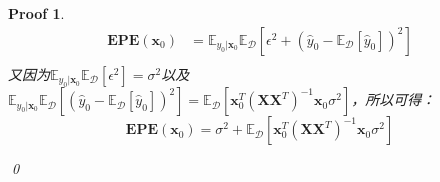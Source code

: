 \documentclass[a4paper,UTF8]{article}
\numberwithin{equation}{section}
\newtheorem*{myProof}{Proof}
\begin{document}
\begin{myProof}
\begin{equation}
\begin{aligned}
\mathbf{EPE}(\textbf{x}_0) &=\mathbb{E}_{y_0|\textbf{x}_0}\mathbb{E}_{\mathcal{D}}[\epsilon^2+(\hat{y}_0 - \mathbb{E}_{\mathcal{D}}[\hat{y}_0])^2]\\
\end{aligned}
\end{equation}
又因为$\mathbb{E}_{y_0|\textbf{x}_0}\mathbb{E}_{\mathcal{D}}[\epsilon^2] = \sigma^2$以及$ \mathbb{E}_{y_0|\textbf{x}_0}\mathbb{E}_{\mathcal{D}}[(\hat{y}_0 - \mathbb{E}_{\mathcal{D}}[\hat{y}_0])^2] = \mathbb{E}_{\mathcal{D}}[\textbf{x}_0^T(\textbf{X}\textbf{X}^T)^{-1}\textbf{x}_0\sigma^2] $，所以可得：
\begin{equation}
\mathbf{EPE}(\textbf{x}_0) = \sigma^2+\mathbb{E}_{\mathcal{D}}[\textbf{x}_0^T(\textbf{X}\textbf{X}^T)^{-1}\textbf{x}_0\sigma^2]
\end{equation}

\qed
\end{myProof}
\end{document}
